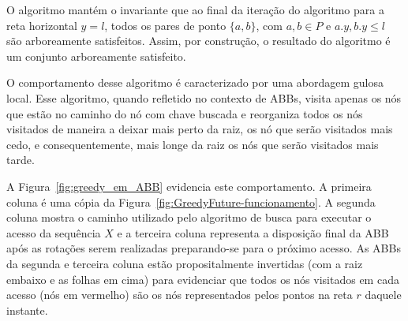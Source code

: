 O algoritmo mantém o invariante que ao final da iteração do algoritmo para a reta horizontal $y = l$, todos os pares de ponto $\{a,b\}$, com $a,b \in P$ e $a.y, b.y \leq l$ são arboreamente satisfeitos. Assim, por construção, o resultado do algoritmo é um conjunto arboreamente satisfeito.

O comportamento desse algoritmo é caracterizado por uma abordagem gulosa local. Esse algoritmo, quando refletido no contexto de ABBs, visita apenas os nós que estão no caminho do nó com chave buscada e reorganiza todos os nós visitados de maneira a deixar mais perto da raiz, os nó que serão visitados mais cedo, e consequentemente, mais longe da raiz os nós que serão visitados mais tarde. 

A Figura~\ref{fig:greedy_em_ABB} evidencia este comportamento. A primeira coluna é uma cópia da Figura~\ref{fig:GreedyFuture-funcionamento}. A segunda coluna mostra o caminho utilizado pelo algoritmo de busca para executar o acesso da sequência $X$ e a terceira coluna representa a disposição final da ABB após as rotações serem realizadas preparando-se para o próximo acesso. As ABBs da segunda e terceira coluna estão propositalmente invertidas (com a raiz embaixo e as folhas em cima) para evidenciar que todos os nós visitados em cada acesso (nós em vermelho) são os nós representados pelos pontos na reta $r$ daquele instante.

